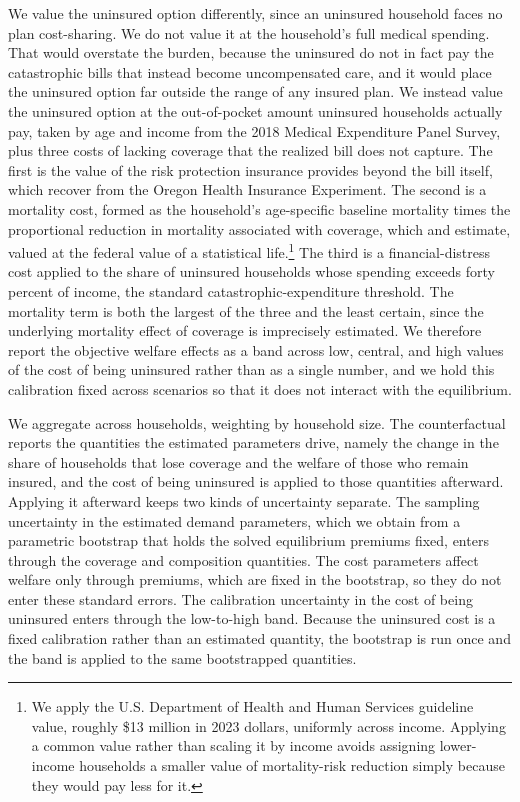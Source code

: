 \documentclass[12pt]{article}
\begin{document}
We value the uninsured option differently, since an uninsured household faces no plan cost-sharing. We do not value it at the household's full medical spending. That would overstate the burden, because the uninsured do not in fact pay the catastrophic bills that instead become uncompensated care, and it would place the uninsured option far outside the range of any insured plan. We instead value the uninsured option at the out-of-pocket amount uninsured households actually pay, taken by age and income from the 2018 Medical Expenditure Panel Survey, plus three costs of lacking coverage that the realized bill does not capture. The first is the value of the risk protection insurance provides beyond the bill itself, which \cite{finkelstein2019jpe} recover from the Oregon Health Insurance Experiment. The second is a mortality cost, formed as the household's age-specific baseline mortality times the proportional reduction in mortality associated with coverage, which \cite{miller2021} and \cite{goldin2021} estimate, valued at the federal value of a statistical life.\footnote{We apply the U.S. Department of Health and Human Services guideline value, roughly \$13 million in 2023 dollars, uniformly across income. Applying a common value rather than scaling it by income avoids assigning lower-income households a smaller value of mortality-risk reduction simply because they would pay less for it.} The third is a financial-distress cost applied to the share of uninsured households whose spending exceeds forty percent of income, the standard catastrophic-expenditure threshold. The mortality term is both the largest of the three and the least certain, since the underlying mortality effect of coverage is imprecisely estimated. We therefore report the objective welfare effects as a band across low, central, and high values of the cost of being uninsured rather than as a single number, and we hold this calibration fixed across scenarios so that it does not interact with the equilibrium.

We aggregate across households, weighting by household size. The counterfactual reports the quantities the estimated parameters drive, namely the change in the share of households that lose coverage and the welfare of those who remain insured, and the cost of being uninsured is applied to those quantities afterward. Applying it afterward keeps two kinds of uncertainty separate. The sampling uncertainty in the estimated demand parameters, which we obtain from a parametric bootstrap that holds the solved equilibrium premiums fixed, enters through the coverage and composition quantities. The cost parameters affect welfare only through premiums, which are fixed in the bootstrap, so they do not enter these standard errors. The calibration uncertainty in the cost of being uninsured enters through the low-to-high band. Because the uninsured cost is a fixed calibration rather than an estimated quantity, the bootstrap is run once and the band is applied to the same bootstrapped quantities.
\end{document}
